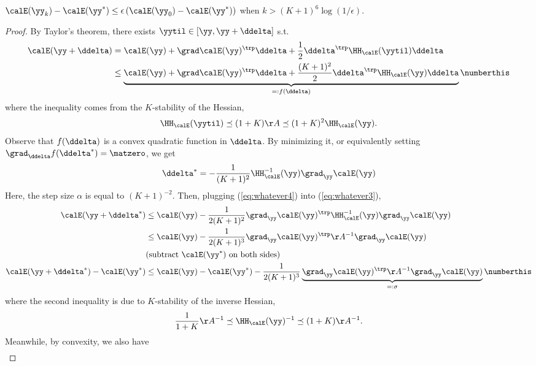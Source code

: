 \begin{theorem}
  $\calE(\yy_k)-\calE(\yy^*) \leq \epsilon \left(\calE(\yy_0)-\calE(\yy^*)\right)$ when $k>(K+1)^6\log(1/\epsilon)$.
\end{theorem}
\begin{proof}
  By Taylor's theorem, there exists $\yytil\in[\yy,\yy+\ddelta]$ s.t.\
  \begin{align*}
    \calE(\yy+\ddelta) &= \calE(\yy) + \grad\calE(\yy)^\trp\ddelta + \frac{1}{2}\ddelta^\trp \HH_{\calE}(\yytil)\ddelta \\
    &\leq \underbrace{\calE(\yy) + \grad\calE(\yy)^\trp\ddelta + \frac{(K+1)^2}{2}\ddelta^\trp \HH_{\calE}(\yy)\ddelta}_{=:f(\ddelta)} \numberthis \label{eq:whatever3}
  \end{align*}
  where the inequality comes from the $K$-stability of the Hessian,
  \[ \HH_{\calE}(\yytil) \preceq (1+K)\AA \preceq (1+K)^2\HH_{\calE}(\yy). \]
  Observe that $f(\ddelta)$ is a convex quadratic function in
  $\ddelta$. By minimizing it, or equivalently setting $\grad_{\ddelta}f(\ddelta^*) = \matzero$, we get
  \begin{equation}
    \label{eq:whatever4}
    \ddelta^* = -\frac{1}{(K+1)^2}\HH_{\calE}^{-1}(\yy)\grad_{\yy}\calE(\yy)
  \end{equation}
  Here, the step size $\alpha$ is equal to $(K+1)^{-2}$.
  Then, plugging (\ref{eq:whatever4}) into (\ref{eq:whatever3}),
  \begin{align*}
    \calE(\yy+\ddelta^*)
    &\leq \calE(\yy) - \frac{1}{2(K+1)^2}\grad_{\yy}\calE(\yy)^\trp \HH_{\calE}^{-1}(\yy) \grad_{\yy}\calE(\yy) \\
    &\leq \calE(\yy) - \frac{1}{2(K+1)^3}\grad_{\yy}\calE(\yy)^\trp \AA^{-1} \grad_{\yy}\calE(\yy) \\
    & (\text{subtract } \calE(\yy^*) \text{ on both sides}) \\
    \calE(\yy+\ddelta^*)-\calE(\yy^*) &\leq \calE(\yy)-\calE(\yy^*) -
                                        \frac{1}{2(K+1)^3}\underbrace{\grad_{\yy}\calE(\yy)^\trp
                                        \AA^{-1}
                                        \grad_{\yy}\calE(\yy)}_{=:\sigma}
                                            \numberthis \label{eq:idk1}
  \end{align*}
  where the second inequality is due to $K$-stability of the inverse Hessian,
  \[ \frac{1}{1+K}\AA^{-1} \preceq \HH_{\calE}(\yy)^{-1} \preceq (1+K)\AA^{-1}. \]
  Meanwhile, by convexity, we also have 
  \begin{align*}

\end{align*}
\end{proof}
